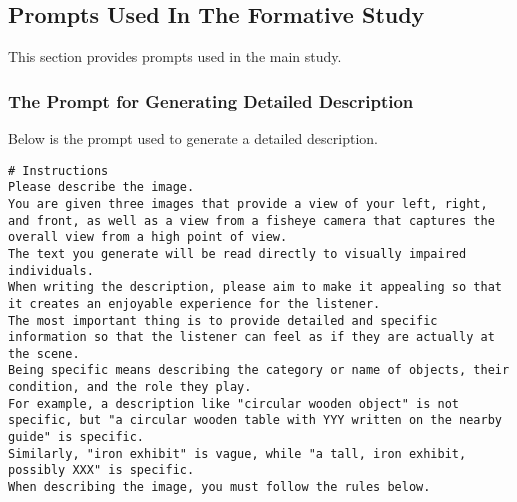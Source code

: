 \subsection{Prompts Used In The Formative Study}
\label{appendix:prompt_main}
This section provides prompts used in the main study.

\subsubsection{The Prompt for Generating Detailed Description}
Below is the prompt used to generate a detailed description.
\begin{lstlisting}
# Instructions  
Please describe the image.  
You are given three images that provide a view of your left, right, and front, as well as a view from a fisheye camera that captures the overall view from a high point of view.
The text you generate will be read directly to visually impaired individuals.  
When writing the description, please aim to make it appealing so that it creates an enjoyable experience for the listener.  
The most important thing is to provide detailed and specific information so that the listener can feel as if they are actually at the scene.  
Being specific means describing the category or name of objects, their condition, and the role they play.  
For example, a description like "circular wooden object" is not specific, but "a circular wooden table with YYY written on the nearby guide" is specific.  
Similarly, "iron exhibit" is vague, while "a tall, iron exhibit, possibly XXX" is specific.  
When describing the image, you must follow the rules below.


\end{lstlisting}
